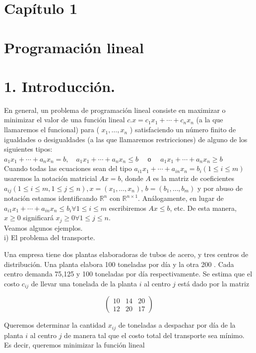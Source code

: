 \documentclass[10pt]{article}
\begin{document}
\section*{Capítulo 1}
\section*{Programación lineal}
\section*{1. Introducción.}
En general, un problema de programación lineal consiste en maximizar o minimizar el valor de una función lineal $c . x=c_{1} x_{1}+\cdots+c_{n} x_{n}$ (a la que llamaremos el funcional) para ( $x_{1}, \ldots, x_{n}$ ) satisfaciendo un número finito de igualdades o desigualdades (a las que llamaremos restricciones) de alguno de los siguientes tipos:\\
$a_{1} x_{1}+\cdots+a_{n} x_{n}=b, \quad a_{1} x_{1}+\cdots+a_{n} x_{n} \leq b \quad$ о $\quad a_{1} x_{1}+\cdots+a_{n} x_{n} \geq b$\\
Cuando todas las ecuaciones sean del tipo $a_{i 1} x_{1}+\cdots+a_{i n} x_{n}=b_{i}(1 \leq i \leq m)$ usaremos la notación matricial $A x=b$, donde $A$ es la matriz de coeficientes $a_{i j}(1 \leq i \leq m, 1 \leq j \leq n), x=\left(x_{1}, \ldots, x_{n}\right)$, $b=\left(b_{1}, \ldots, b_{m}\right)$ y por abuso de notación estamos identificando $\mathbb{R}^{n}$ con $\mathbb{R}^{n \times 1}$. Análogamente, en lugar de $a_{i 1} x_{1}+\cdots+a_{i n} x_{n} \leq b_{i} \forall 1 \leq i \leq m$ escribiremos $A x \leq b$, etc. De esta manera, $x \geq 0$ significará $x_{j} \geq 0 \forall 1 \leq j \leq n$.\\
Veamos algunos ejemplos.\\
i) El problema del transporte.

Una empresa tiene dos plantas elaboradoras de tubos de acero, y tres centros de distribución. Una planta elabora 100 toneladas por día y la otra 200 . Cada centro demanda 75,125 y 100 toneladas por día respectivamente. Se estima que el costo $c_{i j}$ de llevar una tonelada de la planta $i$ al centro $j$ está dado por la matriz

$$
\left(\begin{array}{lll}
10 & 14 & 20 \\
12 & 20 & 17
\end{array}\right)
$$

Queremos determinar la cantidad $x_{i j}$ de toneladas a despachar por día de la planta $i$ al centro $j$ de manera tal que el costo total del transporte sea mínimo. Es decir, queremos minimizar la función lineal
\end{document}
